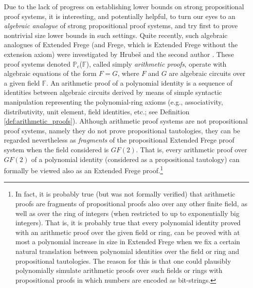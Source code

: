 \documentclass[12pt,reqno]{article}
\newcommand\F{\ensuremath{\mathbb F}}
\newcommand\PP{{\mathbb P}}
\newcommand\PC{\ensuremath{\PP_c}}
\begin{document}
Due to the lack of progress on establishing lower bounds on strong propositional proof systems, it is interesting, and potentially helpful,  to turn our eyes to an \textit{algebraic analogue} of strong propositional proof systems, and try first to prove nontrivial size lower bounds in such settings. Quite recently, such algebraic analogues of Extended Frege (and Frege, which is Extended Frege without the extension axiom) were investigated by Hrube\v s and the second author \cite{HT08,HT12}. These proof systems denoted \PC(\F), called simply \emph{arithmetic proofs}, operate with algebraic equations of the form $F=G$, where $F$ and $G$ are algebraic circuits  over a given field \F. An arithmetic  proof  of a polynomial identity is a sequence of identities between algebraic circuits derived by means of simple syntactic manipulation representing the polynomial-ring axioms (e.g., associativity, distributivity, unit element, field identities, etc.; see Definition \ref{def:arithmetic_proofs}). Although arithmetic proof systems are not propositional proof systems, namely they do not prove propositional tautologies, they can be regarded nevertheless as \textit{fragments} of the propositional Extended Frege proof system when the field considered is $GF(2)$. That is, every arithmetic proof over $GF(2)$ of a polynomial identity  (considered as a propositional  tautology) can formally be viewed also as an Extended Frege proof.\footnote{In fact, it is probably true (but was not formally verified) that arithmetic proofs are fragments of propositional proofs also over any other finite field, as well as over the ring of integers (when restricted to up to exponentially big integers). That is, it is probably true that every polynomial identity proved with an arithmetic proof over the given field or ring, can be proved with at most a polynomial increase in
size in Extended Frege when we fix a certain natural translation between polynomial identities over the field or ring and propositional tautologies. The reason for this is that one could plausibly polynomially simulate arithmetic proofs over such fields or rings with  propositional proofs in which numbers are encoded as bit-strings.}
\end{document}
